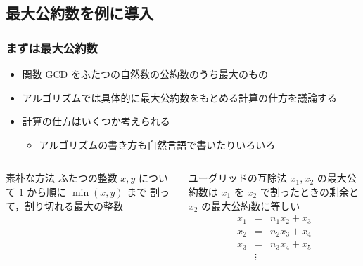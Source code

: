 \subsection{最大公約数を例に導入}
\begin{frame}
\frametitle{まずは最大公約数}
  \begin{itemize}
\item 関数 GCD をふたつの自然数の公約数のうち最大のもの
\item アルゴリズムでは具体的に最大公約数をもとめる計算の仕方を議論する
\item 計算の仕方はいくつか考えられる
    \begin{itemize}
\item アルゴリズムの書き方も自然言語で書いたりいろいろ
    \end{itemize}
  \end{itemize}
  \begin{columns}[t]
    \begin{column}{0.5\textwidth}
      \begin{block}{素朴な方法}
ふたつの整数 \(x, y\) について $1$ から順に \(\min(x,y)\) まで
割って，割り切れる最大の整数
      \end{block}
    \end{column}
    \begin{column}{0.5\textwidth}
      \begin{block}{ユーグリッドの互除法}
\scriptsize
\(x_1, x_2\) の最大公約数は $x_1$ を $x_2$ で割ったときの剰余と $x_2$ の最大公約数に等しい
        \begin{displaymath}
          \begin{array}{rcl}
x_1 &=& n_1 x_2 + x_3\\
x_2 &=& n_2 x_3 + x_4\\
x_3 &=& n_3 x_4 + x_5\\
&\vdots&
          \end{array}
        \end{displaymath}
      \end{block}
    \end{column}
  \end{columns}
\end{frame}

